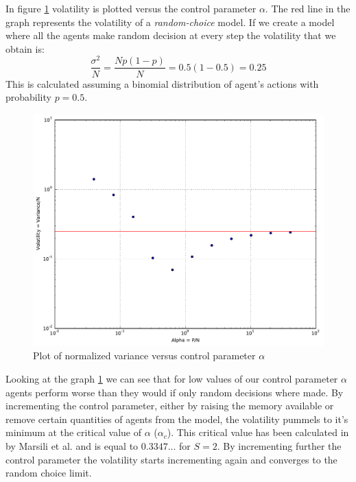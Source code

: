 In figure \ref{fig:normalized variance} volatility is plotted versus the control parameter $\alpha$.
The red line in the graph represents the volatility of a \textit{random-choice} model.
If we create a model where all the agents make random decision at every step the volatility that we obtain is:
\begin{displaymath}
\frac{\sigma^2}{N} = \frac{Np(1-p)}{N} = 0.5(1-0.5) = 0.25
\end{displaymath}
This is calculated assuming a binomial distribution of agent's actions with probability $p=0.5$.

\begin{figure}[h]
\begin{center}
\includegraphics[scale=0.4]{images/minority/alpha_to_norm_var.pdf}
\caption{Plot of normalized variance versus control parameter $\alpha$}
\label{fig:normalized variance}
\end{center}
\end{figure}

Looking at the graph \ref{fig:normalized variance} we can see that for low values of our control parameter $\alpha$ agents perform worse than they would if only random decisions where made.
By incrementing the control parameter, either by raising the memory available or remove certain quantities of agents from the model, the volatility pummels to it's minimum at the critical value of $\alpha$ ($\alpha_c$).
This critical value has been calculated in \cite{marsili2000exact} by Marsili et al. and is equal to $0.3347...$ for $S=2$.
By incrementing further the control parameter the volatility starts incrementing again and converges to the random choice limit.

